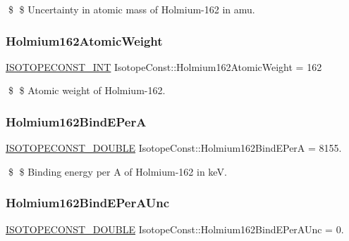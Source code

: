 \$ \$ Uncertainty in atomic mass of Holmium-\/162 in amu. \mbox{\label{group___isotope_const-_holmium-_ho162_ga332912b734b8a51b4105171c8634edb4}} 
\subsubsection{\texorpdfstring{Holmium162\+Atomic\+Weight}{Holmium162AtomicWeight}}
{\footnotesize\ttfamily \mbox{\hyperlink{group___isotope_const-_macros_ga5f18360b3e99483a35c32d789e62621c}{I\+S\+O\+T\+O\+P\+E\+C\+O\+N\+S\+T\+\_\+\+I\+NT}} Isotope\+Const\+::\+Holmium162\+Atomic\+Weight = 162}

\$ \$ Atomic weight of Holmium-\/162. \mbox{\label{group___isotope_const-_holmium-_ho162_ga19b1e0c5080907f47b3ea61cf8ce3e09}} 
\subsubsection{\texorpdfstring{Holmium162\+Bind\+E\+PerA}{Holmium162BindEPerA}}
{\footnotesize\ttfamily \mbox{\hyperlink{group___isotope_const-_macros_ga8f45a7272ce02c0b4c65c44636ed719a}{I\+S\+O\+T\+O\+P\+E\+C\+O\+N\+S\+T\+\_\+\+D\+O\+U\+B\+LE}} Isotope\+Const\+::\+Holmium162\+Bind\+E\+PerA = 8155.}

\$ \$ Binding energy per A of Holmium-\/162 in keV. \mbox{\label{group___isotope_const-_holmium-_ho162_gad305be28c093b0988970bfcb3268cf39}} 
\subsubsection{\texorpdfstring{Holmium162\+Bind\+E\+Per\+A\+Unc}{Holmium162BindEPerAUnc}}
{\footnotesize\ttfamily \mbox{\hyperlink{group___isotope_const-_macros_ga8f45a7272ce02c0b4c65c44636ed719a}{I\+S\+O\+T\+O\+P\+E\+C\+O\+N\+S\+T\+\_\+\+D\+O\+U\+B\+LE}} Isotope\+Const\+::\+Holmium162\+Bind\+E\+Per\+A\+Unc = 0.}

